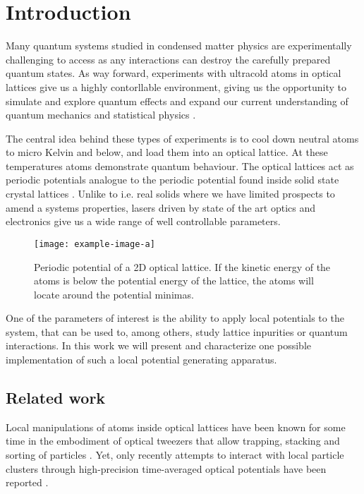 \chapter{Introduction}

Many quantum systems studied in condensed matter physics are experimentally
challenging to access as any interactions can destroy the carefully prepared
quantum states. As way forward, experiments with ultracold atoms in
optical lattices give us a highly contorllable environment, giving us the
opportunity to simulate and explore quantum effects and expand our current
understanding of quantum mechanics and statistical physics \cite{Gross2017}.

The central idea behind these types of experiments is to cool down neutral
atoms to micro Kelvin and below, and load them into an optical lattice. At
these temperatures atoms demonstrate quantum behaviour. The optical lattices
act as periodic potentials analogue to the periodic potential found inside
solid state crystal lattices \cite{Lewenstein2007}. Unlike to i.e. real solids
where we have limited prospects to amend a systems properties, lasers driven
by state of the art optics and electronics give us a wide range of well
controllable parameters.

\begin{figure}[h]
  \centering
  \texttt{[image: example-image-a]}
  \captionsetup{width=.8\textwidth}
  \caption{Periodic potential of a 2D optical lattice. If the kinetic energy
  of the atoms is below the potential energy of the lattice, the atoms will
  locate around the potential minimas.}
  \label{fig:optlat}
\end{figure}

One of the parameters of interest is the ability to apply local potentials
to the system, that can be used to, among others, study lattice inpurities
or quantum interactions. In this work we will present and characterize one
possible implementation of such a local potential generating apparatus.

\section{Related work}

Local manipulations of atoms inside optical lattices have been known for some
time in the embodiment of optical tweezers that allow trapping, stacking and
sorting of particles \cite{Tadmor2004}. Yet, only recently attempts to
interact with local particle clusters through high-precision time-averaged
optical potentials have been reported \cite{Roy2016}.

